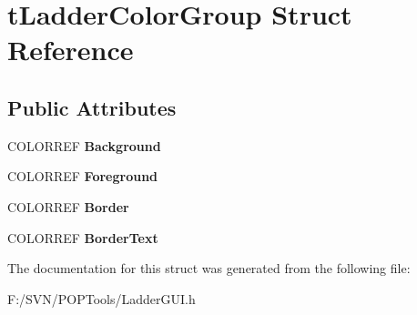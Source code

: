 \hypertarget{structt_ladder_color_group}{\section{t\-Ladder\-Color\-Group Struct Reference}
\label{structt_ladder_color_group}
}
\subsection*{Public Attributes}
\begin{DoxyCompactItemize}
\item 
\hypertarget{structt_ladder_color_group_ab8dcb7e1f6a87a1ab3267d4eb4ea368c}{C\-O\-L\-O\-R\-R\-E\-F {\bfseries Background}}\label{structt_ladder_color_group_ab8dcb7e1f6a87a1ab3267d4eb4ea368c}

\item 
\hypertarget{structt_ladder_color_group_ab915d77e180e0b3de26aa5f4d4f890d9}{C\-O\-L\-O\-R\-R\-E\-F {\bfseries Foreground}}\label{structt_ladder_color_group_ab915d77e180e0b3de26aa5f4d4f890d9}

\item 
\hypertarget{structt_ladder_color_group_a9e8a87850780196f50ee1b34b7728594}{C\-O\-L\-O\-R\-R\-E\-F {\bfseries Border}}\label{structt_ladder_color_group_a9e8a87850780196f50ee1b34b7728594}

\item 
\hypertarget{structt_ladder_color_group_a7f0af5b2d0f4b87cb32bc2d48e1eb42c}{C\-O\-L\-O\-R\-R\-E\-F {\bfseries Border\-Text}}\label{structt_ladder_color_group_a7f0af5b2d0f4b87cb32bc2d48e1eb42c}

\end{DoxyCompactItemize}


The documentation for this struct was generated from the following file\-:\begin{DoxyCompactItemize}
\item 
F\-:/\-S\-V\-N/\-P\-O\-P\-Tools/Ladder\-G\-U\-I.\-h\end{DoxyCompactItemize}

